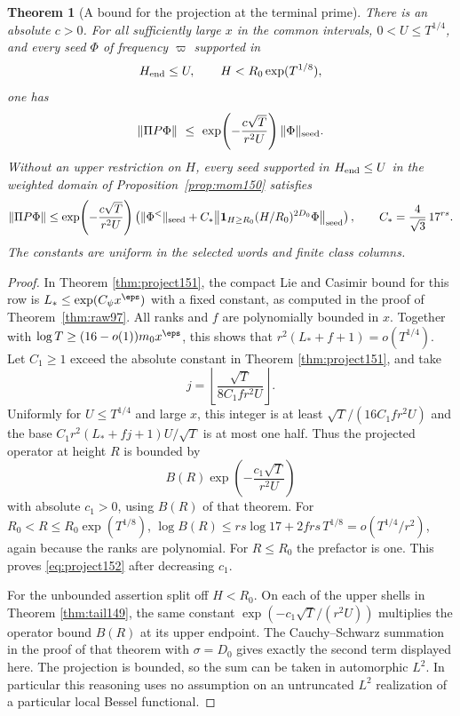 \documentclass[a4paper,11pt]{article}
\newtheorem{theorem}[proposition]{Theorem}
\theoremstyle{definition}
\theoremstyle{remark}
\numberwithin{equation}{section}
\begin{document}
\begin{theorem}[A bound for the projection at the terminal prime]
\label{thm:project152}
There is an absolute \(c>0\). For all sufficiently large \(x\)
in the common intervals, \(0<U\le T^{1/4}\), and every seed
\(\Phi\) of frequency \(\varpi\) supported in
\[
       H_{\rm end}\le U,\qquad H<R_0\exp(T^{1/8}),
\]
one has
\begin{equation}
       \|\Pi P\Phi\|\ \le\
       \exp\!\left(-\frac{c\sqrt T}{r^2 U}\right)\|\Phi\|_{\rm seed}.
       \label{eq:project152}
\end{equation}
Without an upper restriction on \(H\), every seed supported in
\(H_{\rm end}\le U\) in the weighted domain of
Proposition~\ref{prop:mom150} satisfies
\[
 \|\Pi P\Phi\|\le
       \exp\!\left(-\frac{c\sqrt T}{r^2 U}\right)
       \left(\|\Phi^{<}\|_{\rm seed}
        +C_*\big\|\mathbf1_{H\ge R_0}(H/R_0)^{2D_0}\Phi\big\|_{\rm seed}
       \right),\qquad C_*=\frac{4}{\sqrt3}\,17^{rs}.
\]
The constants are uniform in the selected words and finite
class columns.
\end{theorem}
\begin{proof}
In Theorem \ref{thm:project151}, the compact Lie and Casimir bound
for this row is \(L_*\le\exp(C_\psi x^\eps)\) with a fixed
constant, as computed in the proof of Theorem~\ref{thm:raw97}.
All ranks and \(f\) are polynomially bounded in \(x\).
Together with \(\log T\ge(16-o(1))m_0x^\eps\), this shows
that \(r^2(L_*+f+1)=o(T^{1/4})\).
Let \(C_1\ge1\) exceed the absolute constant in Theorem \ref{thm:project151}, and take
\[
          j=\left\lfloor
                    \frac{\sqrt T}{8C_1 f r^2 U}\right\rfloor .
\]
Uniformly for \(U\le T^{1/4}\) and large \(x\), this integer
is at least \(\sqrt T/(16C_1 f r^2 U)\) and the base
\(C_1 r^2(L_*+fj+1)U/\sqrt T\) is at most one half.
Thus the projected operator at height \(R\) is bounded by
\[
           B(R)\exp\!\left(-\frac{c_1\sqrt T}{r^2 U}\right)
\]
with absolute \(c_1>0\), using \(B(R)\) of that theorem.
For \(R_0<R\le R_0\exp(T^{1/8})\),
\(\log B(R)\le rs\log17+2frs\,T^{1/8}
=o(T^{1/4}/r^2)\), again because the ranks are polynomial.
For \(R\le R_0\) the prefactor is one. This proves
\eqref{eq:project152} after decreasing \(c_1\).

For the unbounded assertion split off \(H<R_0\). On each
of the upper shells in Theorem \ref{thm:tail149}, the same
constant \(\exp(-c_1\sqrt T/(r^2 U))\) multiplies the
operator bound \(B(R)\) at its upper endpoint. The
Cauchy--Schwarz summation in the proof of that theorem with
\(\sigma=D_0\) gives exactly the second term displayed here.
The projection is bounded, so the sum can be taken in
automorphic \(L^2\). In particular this reasoning uses no
assumption on an untruncated \(L^2\) realization of a
particular local Bessel functional.
\end{proof}
\end{document}
